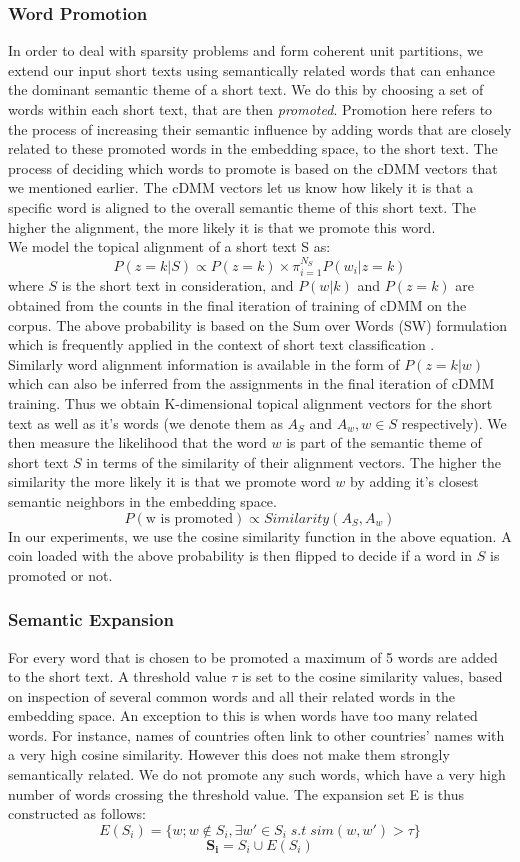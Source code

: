\documentclass{sig-alternate-05-2015}
\begin{document}
\subsubsection{Word Promotion}
In order to deal with sparsity problems and form coherent unit partitions, we extend our input short texts using semantically related words that can enhance the dominant semantic theme of a short text. We do this by choosing a set of words within each short text, that are then \emph{promoted}. Promotion here refers to the process of increasing their semantic influence by adding words that are closely related to these promoted words in the embedding space, to the short text. The process of deciding which words to promote is based on the cDMM vectors that we mentioned earlier. The cDMM vectors let us know how likely it is that a specific word is aligned to the overall semantic theme of this short text. The higher the alignment, the more likely it is that we promote this word.\\
We model the topical alignment of a short text S as:
$$P(z=k|S) \propto P(z=k)\times \pi_{i=1}^{N_S} P(w_{i}|z=k)$$
where $S$ is the short text in consideration, and $P(w|k)$ and $P(z=k)$ are obtained from the counts in the final iteration of training of cDMM on the corpus. The above probability is based on the Sum over Words (SW) formulation which is frequently applied in the context of short text classification \cite{btm}. \\
Similarly word alignment information is available in the form of $P(z=k|w)$ which can also be inferred from the assignments in the final iteration of cDMM training. Thus we obtain K-dimensional topical alignment vectors for the short text as well as it's words (we denote them as $A_{S}$ and $A_{w}, w \in S$ respectively). We then measure the likelihood that the word $w$ is part of the semantic theme of short text $S$ in terms of the similarity of their alignment vectors. The higher the similarity the more likely it is that we promote word $w$ by adding it's closest semantic neighbors in the embedding space.
$$P(\text{w is promoted}) \propto Similarity(A_{S}, A_{w})$$
In our experiments,  we use the cosine similarity function in the above equation. A coin loaded with the above probability is then flipped to decide if a word in $S$ is promoted or not.
\subsubsection{Semantic Expansion}
For every word that is chosen to be promoted a maximum of 5 words are added to the short text. A threshold value $\tau$ is set to the cosine similarity values, based on inspection of several common words and all their related words in the embedding space. An exception to this is when words have too many related words. For instance, names of countries often link to other countries' names with a very high cosine similarity. However this does not make them strongly semantically related. We do not promote any such words, which have a very high number of words crossing the threshold value. The expansion set E is thus constructed as follows:
$$E(S_{i}) = \{w; w \notin S_{i}, \exists w'\in S_{i}\; s.t \; sim(w, w') > \tau\}$$
$$\mathbf{S_{i}} = S_{i} \cup E(S_{i})$$
\end{document}
